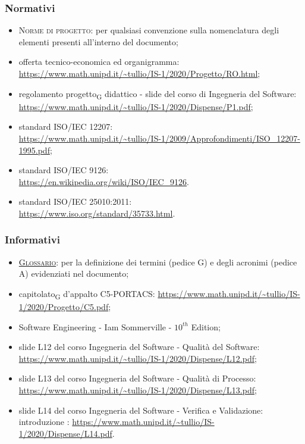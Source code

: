     \subsubsection{Normativi}
    \begin{itemize}
    	\item \textsc{Norme di progetto}: per qualsiasi convenzione sulla nomenclatura degli elementi presenti all'interno del documento;
    	\item offerta tecnico-economica ed organigramma: \newline  \url{https://www.math.unipd.it/~tullio/IS-1/2020/Progetto/RO.html};
    	\item regolamento progetto\textsubscript{G} didattico - slide del corso di Ingegneria del Software: \newline \url{https://www.math.unipd.it/~tullio/IS-1/2020/Dispense/P1.pdf};
        \item standard ISO/IEC 12207:\\ \url{https://www.math.unipd.it/~tullio/IS-1/2009/Approfondimenti/ISO_12207-1995.pdf};
        \item standard ISO/IEC 9126:\\
        \url{https://en.wikipedia.org/wiki/ISO/IEC_9126}.
        \item standard ISO/IEC 25010:2011:\\
        \url{https://www.iso.org/standard/35733.html}.
    \end{itemize}

    \subsubsection{Informativi}
    \begin{itemize}
        \item \textsc{\href{https://github.com/Three-Way-Milkshake/docs/wiki/Glossario}{Glossario}}: per la definizione dei termini (pedice G) e degli acronimi (pedice A) evidenziati nel documento;
    	\item capitolato\textsubscript{G} d'appalto C5-PORTACS: \newline
    	\url{https://www.math.unipd.it/~tullio/IS-1/2020/Progetto/C5.pdf};
       	\item Software Engineering - Iam Sommerville - $10^{th}$ Edition;
        \item slide L12 del corso Ingegneria del Software - Qualità del Software:\newline
        \url{https://www.math.unipd.it/~tullio/IS-1/2020/Dispense/L12.pdf};
        \item slide L13 del corso Ingegneria del Software - Qualità di Processo:\newline
        \url{https://www.math.unipd.it/~tullio/IS-1/2020/Dispense/L13.pdf};
        \item slide L14 del corso Ingegneria del Software - Verifica e Validazione: introduzione :\newline
        \url{https://www.math.unipd.it/~tullio/IS-1/2020/Dispense/L14.pdf}.
    \end{itemize}